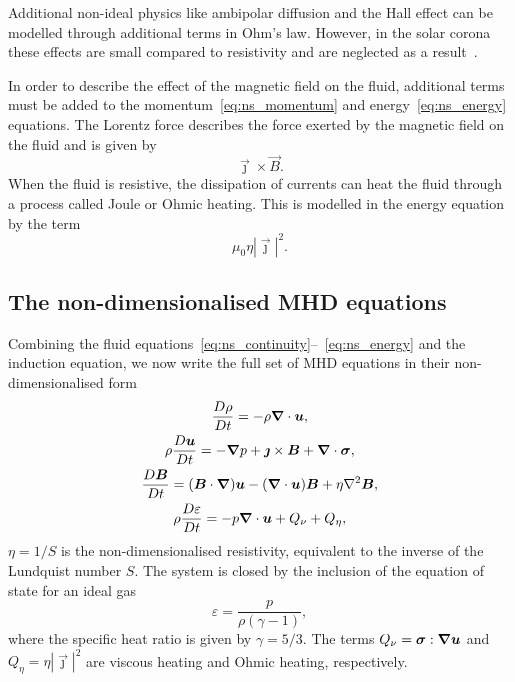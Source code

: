 Additional non-ideal physics like ambipolar diffusion and the Hall effect can be modelled through additional terms in Ohm's law. However, in the solar corona these effects are small compared to resistivity and are neglected as a result~\cite{priestMagnetohydrodynamicsSuna}.

In order to describe the effect of the magnetic field on the fluid, additional terms must be added to the momentum~\ref{eq:ns_momentum} and energy~\ref{eq:ns_energy} equations. The Lorentz force describes the force exerted by the magnetic field on the fluid and is given by
\begin{equation}
  \label{eq:lorentz_force}
\vec{\jmath} \times \vec{B}.
\end{equation}
When the fluid is resistive, the dissipation of currents can heat the fluid through a process called Joule or Ohmic heating. This is modelled in the energy equation by the term
\begin{equation}
\mu_0 \eta | \vec{\jmath} |^2.
\end{equation}

\subsection{The non-dimensionalised MHD equations}

\label{sec:mhd_equations}

Combining the fluid equations~\ref{eq:ns_continuity}--~\ref{eq:ns_energy} and the induction equation, we now write the full set of MHD equations in their non-dimensionalised form
\begin{gather}
\label{eq:mhda}
\frac{D\rho}{Dt} = - \rho \vec{\nabla} \cdot \vec{u},\\
\rho\frac{D\vec{u}}{Dt} = -\vec{\nabla} p + \vec{\jmath} \times \vec{B} + \vec{\nabla} \cdot \ten{\sigma},\\
\frac{D\vec{B}}{Dt} = (\vec{B} \cdot \vec{\nabla})\vec{u} - (\vec{\nabla} \cdot \vec{u})\vec{B} + \eta \nabla^2 \vec{B},\\
\rho\frac{D\varepsilon}{Dt} = -p \vec{\nabla} \cdot \vec{u} + {Q}_{\nu} + {Q}_{\eta},%
\label{eq:energy}
\end{gather}
$\eta = 1/S$ is the non-dimensionalised resistivity, equivalent
to the inverse of the Lundquist number $S$. The system is closed by the inclusion of the equation of state for an ideal gas
\begin{equation}
\varepsilon = \frac{p}{\rho(\gamma - 1)},
\end{equation}
where the specific heat ratio is given by $\gamma = 5/3$. The
  terms ${Q}_{\nu} = {\bm \sigma} : {\bm \nabla}{\bm u}$ and
  ${Q}_{\eta} = \eta | \vec{\jmath} |^2$ are viscous heating and Ohmic heating, respectively.

